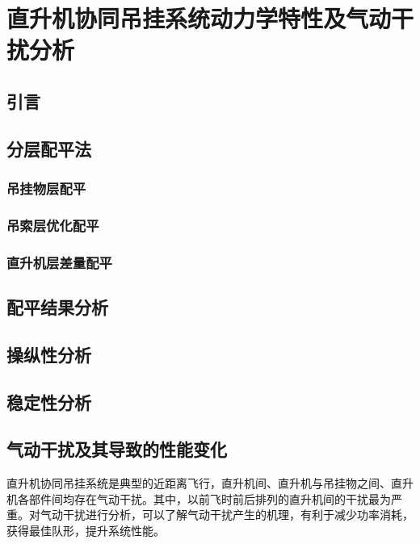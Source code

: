 \chapter{直升机协同吊挂系统动力学特性及气动干扰分析}
\section{引言}
\section{分层配平法}
\subsection{吊挂物层配平}
\subsection{吊索层优化配平}
\subsection{直升机层差量配平}
\section{配平结果分析}
\section{操纵性分析}
\section{稳定性分析}
\section{气动干扰及其导致的性能变化}
直升机协同吊挂系统是典型的近距离飞行，直升机间、直升机与吊挂物之间、直升机各部件间均存在气动干扰。其中，以前飞时前后排列的直升机间的干扰最为严重。对气动干扰进行分析，可以了解气动干扰产生的机理，有利于减少功率消耗，获得最佳队形，提升系统性能。
